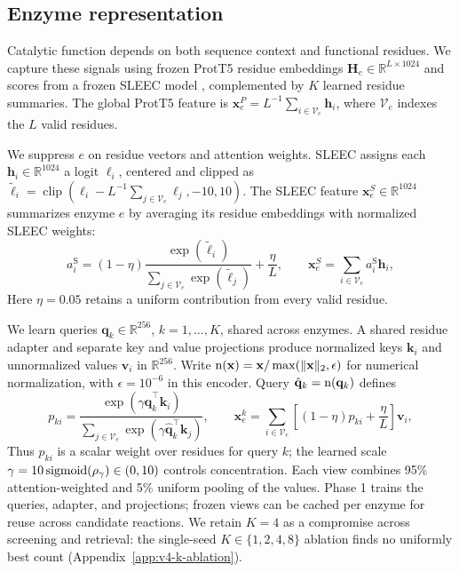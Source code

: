\subsection{Enzyme representation}
\label{sec:enzyme-representation}
\label{sec:enzyme-encoder}
\label{sec:paper-v4-encoders}
Catalytic function depends on both sequence context and functional residues.
We capture these signals using frozen
ProtT5 residue embeddings $\mathbf{H}_e\in\mathbb R^{L\times1024}$
\citep{elnaggar2022prottrans} and scores from a frozen SLEEC model
\citep{gong2026sleec}, complemented by $K$ learned residue summaries.
The global ProtT5 feature is
$\mathbf{x}_e^{P}=L^{-1}\sum_{i\in\mathcal V_e}\mathbf{h}_i$,
where $\mathcal V_e$ indexes the $L$ valid residues.

We suppress $e$ on residue vectors and attention weights.
SLEEC assigns each $\mathbf{h}_i\in\mathbb R^{1024}$
a logit $\ell_i$, centered and clipped as
$\tilde\ell_i=\operatorname{clip}(\ell_i-L^{-1}\sum_{j\in\mathcal V_e}\ell_j,-10,10)$.
The SLEEC feature $\mathbf{x}_e^{S}\in\mathbb R^{1024}$ summarizes enzyme $e$
by averaging its residue embeddings with normalized SLEEC weights:
\begin{equation}
 a_i^{\mathrm S}=(1-\eta)
 \frac{\exp(\tilde\ell_i)}{\sum_{j\in\mathcal V_e}\exp(\tilde\ell_j)}
 +\frac{\eta}{L},\qquad
 \mathbf{x}_e^{S}=\sum_{i\in\mathcal V_e}a_i^{\mathrm S}\mathbf{h}_i,
 \label{eq:sleec-attention}
\end{equation}
Here $\eta=0.05$ retains a uniform contribution from every valid residue.

We learn queries $\mathbf{q}_k\in\mathbb R^{256}$, $k=1,\ldots,K$, shared
across enzymes. A shared residue adapter and separate key and value projections
produce normalized keys $\mathbf{k}_i$ and unnormalized values $\mathbf{v}_i$
in $\mathbb R^{256}$. Write $\operatorname{n}(\mathbf{x})=\mathbf{x}/\max(\|\mathbf{x}\|_2,\epsilon)$
for numerical normalization, with $\epsilon=10^{-6}$ in this encoder.
Query $\hat{\mathbf{q}}_k=\operatorname{n}(\mathbf{q}_k)$ defines
\begin{equation}
 p_{ki}=\frac{\exp(\gamma\hat{\mathbf{q}}_k^\top\mathbf{k}_i)}
 {\sum_{j\in\mathcal V_e}\exp(\gamma\hat{\mathbf{q}}_k^\top\mathbf{k}_j)},
 \qquad
 \mathbf{x}_e^{k}=\sum_{i\in\mathcal V_e}
 \left[(1-\eta)p_{ki}+\frac{\eta}{L}\right]\mathbf{v}_i,
 \label{eq:paper-learned-views}
\end{equation}
Thus $p_{ki}$ is a scalar weight over residues for query $k$; the learned scale
$\gamma=10\operatorname{sigmoid}(\rho_\gamma)\in(0,10)$ controls concentration. Each view
combines 95\% attention-weighted and 5\% uniform pooling of the values.
Phase 1 trains the queries, adapter, and projections; frozen views can be
cached per enzyme for reuse across candidate reactions. We retain
$K=4$ as a compromise across screening and retrieval: the single-seed
$K\in\{1,2,4,8\}$ ablation finds no uniformly best count
(Appendix~\ref{app:v4-k-ablation}).

